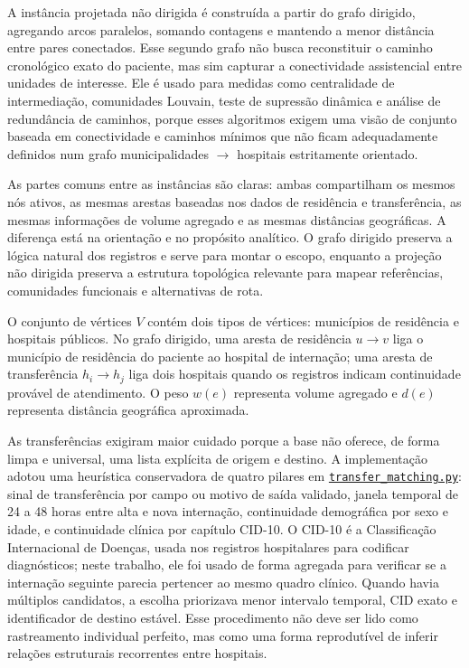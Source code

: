 \documentclass[10pt,a4paper]{article}
\newcommand{\repo}{https://github.com/lcardosott/sus-graph-project}
\newcommand{\repobranch}{gh-pages}
\newcommand{\ghfile}[2]{\href{\repo/blob/\repobranch/#1}{\texttt{#2}}}
\begin{document}
A instância projetada não dirigida é construída a partir do grafo dirigido, agregando arcos paralelos, somando contagens e mantendo a menor distância entre pares conectados. Esse segundo grafo não busca reconstituir o caminho cronológico exato do paciente, mas sim capturar a conectividade assistencial entre unidades de interesse. Ele é usado para medidas como centralidade de intermediação, comunidades Louvain, teste de supressão dinâmica e análise de redundância de caminhos, porque esses algoritmos exigem uma visão de conjunto baseada em conectividade e caminhos mínimos que não ficam adequadamente definidos num grafo municipalidades $\rightarrow$ hospitais estritamente orientado.

As partes comuns entre as instâncias são claras: ambas compartilham os mesmos nós ativos, as mesmas arestas baseadas nos dados de residência e transferência, as mesmas informações de volume agregado e as mesmas distâncias geográficas. A diferença está na orientação e no propósito analítico. O grafo dirigido preserva a lógica natural dos registros e serve para montar o escopo, enquanto a projeção não dirigida preserva a estrutura topológica relevante para mapear referências, comunidades funcionais e alternativas de rota.

O conjunto de vértices $V$ contém dois tipos de vértices: municípios de residência e hospitais públicos. No grafo dirigido, uma aresta de residência $u \rightarrow v$ liga o município de residência do paciente ao hospital de internação; uma aresta de transferência $h_i \rightarrow h_j$ liga dois hospitais quando os registros indicam continuidade provável de atendimento. O peso $w(e)$ representa volume agregado e $d(e)$ representa distância geográfica aproximada.

As transferências exigiram maior cuidado porque a base não oferece, de forma limpa e universal, uma lista explícita de origem e destino. A implementação adotou uma heurística conservadora de quatro pilares em \ghfile{data_layer/transfer_matching.py}{transfer\_matching.py}: sinal de transferência por campo ou motivo de saída validado, janela temporal de 24 a 48 horas entre alta e nova internação, continuidade demográfica por sexo e idade, e continuidade clínica por capítulo CID-10. O CID-10 é a Classificação Internacional de Doenças, usada nos registros hospitalares para codificar diagnósticos; neste trabalho, ele foi usado de forma agregada para verificar se a internação seguinte parecia pertencer ao mesmo quadro clínico. Quando havia múltiplos candidatos, a escolha priorizava menor intervalo temporal, CID exato e identificador de destino estável. Esse procedimento não deve ser lido como rastreamento individual perfeito, mas como uma forma reprodutível de inferir relações estruturais recorrentes entre hospitais.
\end{document}
